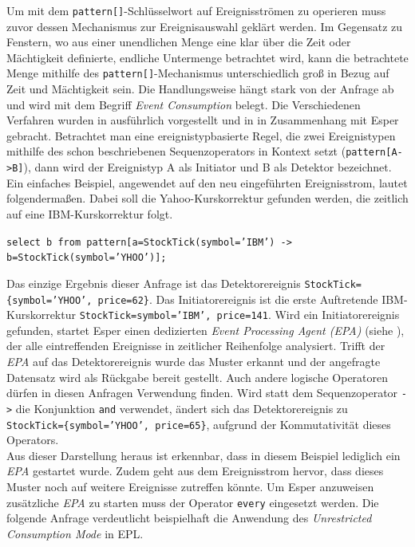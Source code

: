 \documentclass{acm_proc_article-sp}
\begin{document}
Um mit dem \texttt{pattern[]}-Schlüsselwort auf Ereignisströmen zu operieren muss zuvor 
dessen Mechanismus zur Ereignisauswahl geklärt werden. Im Gegensatz zu Fenstern, wo aus 
einer unendlichen Menge eine klar über die Zeit oder Mächtigkeit definierte, endliche 
Untermenge betrachtet wird, kann die  betrachtete Menge mithilfe des 
\texttt{pattern[]}-Mechanismus unterschiedlich groß in Bezug auf Zeit und Mächtigkeit 
sein. Die Handlungsweise hängt stark von der Anfrage ab und wird mit dem Begriff  
\textit{Event Consumption} belegt. Die Verschiedenen Verfahren wurden in 
\cite{adaikkalavan} ausführlich vorgestellt und in \cite{hedtstuck} in Zusammenhang mit 
Esper gebracht. Betrachtet man eine ereignistypbasierte Regel, die zwei Ereignistypen 
mithilfe des schon beschriebenen Sequenzoperators in Kontext setzt 
(\texttt{pattern[A->B]}), dann wird der Ereignistyp A als Initiator und B als Detektor 
bezeichnet. Ein einfaches Beispiel, angewendet auf den neu eingeführten Ereignisstrom, 
lautet folgendermaßen. Dabei soll die Yahoo-Kurskorrektur gefunden werden, die zeitlich 
auf eine IBM-Kurskorrektur folgt.

\texttt{select b from pattern[a=StockTick(symbol='IBM') ->\\ 
b=StockTick(symbol='YHOO')];}

Das einzige Ergebnis dieser Anfrage ist das Detektorereignis 
\texttt{StockTick=\{symbol='YHOO', price=62\}}. Das Initiatorereignis ist die erste 
Auftretende IBM-Kurskorrektur \texttt{StockTick={symbol='IBM', price=141}}. Wird ein 
Initiatorereignis gefunden, startet Esper einen dedizierten \textit{Event Processing 
Agent (EPA)} (siehe \cite{bruns}), der alle eintreffenden Ereignisse in zeitlicher 
Reihenfolge analysiert. Trifft der \textit{EPA} auf das Detektorereignis wurde das Muster 
erkannt und der angefragte Datensatz wird als Rückgabe bereit gestellt. Auch andere 
logische Operatoren dürfen in diesen Anfragen Verwendung finden. Wird statt dem 
Sequenzoperator \texttt{->} die Konjunktion \texttt{and} verwendet, ändert sich das 
Detektorereignis zu \texttt{StockTick=\{symbol='YHOO', price=65\}}, aufgrund der 
Kommutativität dieses Operators.\\
Aus dieser Darstellung heraus ist erkennbar, dass in diesem Beispiel lediglich ein 
\textit{EPA} gestartet wurde. Zudem geht aus dem Ereignisstrom hervor, dass dieses Muster 
noch auf weitere Ereignisse zutreffen könnte. Um Esper anzuweisen zusätzliche 
\textit{EPA} zu starten muss der Operator \texttt{every} eingesetzt werden. Die folgende 
Anfrage verdeutlicht beispielhaft die Anwendung des 
\textit{Unrestricted Consumption Mode} in EPL.
\end{document}
